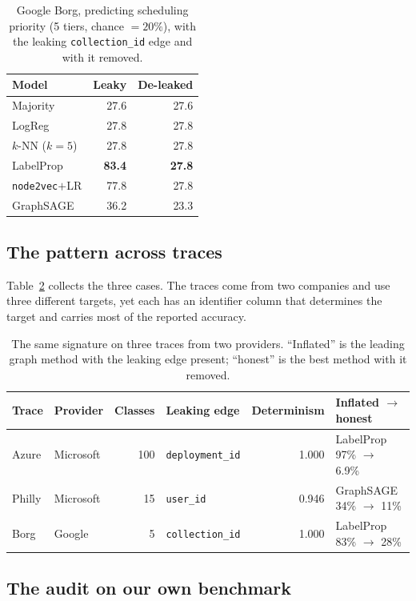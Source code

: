 \documentclass[11pt]{article}
\newcommand{\code}[1]{\texttt{#1}}
\begin{document}
\begin{table}[h]
\centering
\caption{Google Borg, predicting scheduling priority (5 tiers, chance $=20\%$),
with the leaking \code{collection\_id} edge and with it removed.}
\label{tab:google}
\begin{tabular}{lrr}
\toprule
Model & Leaky & \textbf{De-leaked} \\
\midrule
Majority             & 27.6 & 27.6 \\
LogReg               & 27.8 & 27.8 \\
$k$-NN ($k{=}5$)     & 27.8 & 27.8 \\
LabelProp            & \textbf{83.4} & \textbf{27.8} \\
\code{node2vec}$+$LR & 77.8 & 27.8 \\
GraphSAGE            & 36.2 & 23.3 \\
\bottomrule
\end{tabular}
\end{table}

\subsection{The pattern across traces}

Table~\ref{tab:cross} collects the three cases. The traces come from two
companies and use three different targets, yet each has an identifier column
that determines the target and carries most of the reported accuracy.

\begin{table}[h]
\centering
\caption{The same signature on three traces from two providers. ``Inflated'' is
the leading graph method with the leaking edge present; ``honest'' is the best
method with it removed.}
\label{tab:cross}
\begin{tabular}{llrlrl}
\toprule
Trace & Provider & Classes & Leaking edge & Determinism & Inflated $\rightarrow$ honest \\
\midrule
Azure  & Microsoft & 100 & \code{deployment\_id} & 1.000 & LabelProp 97\% $\rightarrow$ 6.9\% \\
Philly & Microsoft & 15  & \code{user\_id}       & 0.946 & GraphSAGE 34\% $\rightarrow$ 11\% \\
Borg   & Google    & 5   & \code{collection\_id} & 1.000 & LabelProp 83\% $\rightarrow$ 28\% \\
\bottomrule
\end{tabular}
\end{table}

\subsection{The audit on our own benchmark}
\label{sec:reflexive}
\end{document}
